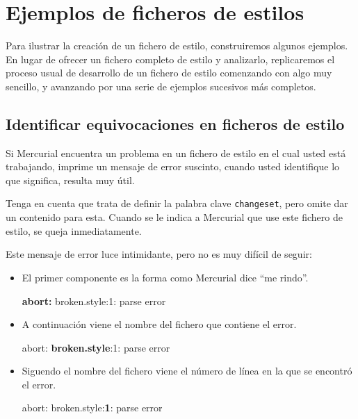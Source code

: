 {{\section{Ejemplos de ficheros de estilos}

Para ilustrar la creación de un fichero de estilo, construiremos
algunos ejemplos.  En lugar de ofrecer un fichero completo de estilo y
analizarlo, replicaremos el proceso usual de desarrollo de un fichero
de estilo comenzando con algo muy sencillo, y avanzando por una serie
de ejemplos sucesivos más completos.

\subsection{Identificar equivocaciones en ficheros de estilo}

Si Mercurial encuentra un problema en un fichero de estilo en el cual
usted está trabajando, imprime un mensaje de error suscinto, cuando
usted identifique lo que significa, resulta muy útil.


Tenga en cuenta que  trata de definir la
palabra clave \texttt{changeset}, pero omite dar un contenido para esta.
Cuando se le indica a Mercurial que use este fichero de estilo, se
queja inmediatamente.


Este mensaje de error luce intimidante, pero no es muy difícil de
seguir:

\begin{itemize}
\item El primer componente es la forma como Mercurial dice ``me rindo''.
  \begin{codesample4}
    \textbf{abort:} broken.style:1: parse error
  \end{codesample4}

\item A continuación viene el nombre del fichero que contiene el error.
  \begin{codesample4}
    abort: \textbf{broken.style}:1: parse error
  \end{codesample4}

\item Siguendo el nombre del fichero viene el número de línea en la
  que se encontró el error.
  \begin{codesample4}
    abort: broken.style:\textbf{1}: parse error
  \end{codesample4}


\end{itemize}}}
